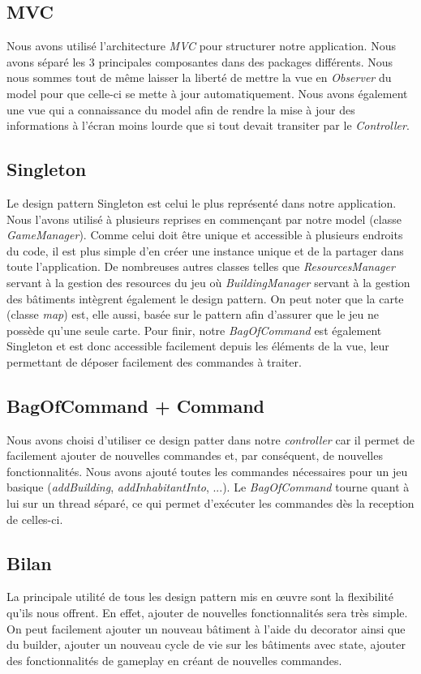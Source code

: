 \documentclass{article}
\begin{document}
\subsection{MVC}
Nous avons utilisé l'architecture \textit{MVC} pour structurer notre application. Nous avons séparé les 3 principales composantes
dans des packages différents. Nous nous sommes tout de même laisser la liberté de mettre la vue en \textit{Observer} du model pour
que celle-ci se mette à jour automatiquement. Nous avons également une vue qui a connaissance du model afin de rendre la mise à
jour des informations à l'écran moins lourde que si tout devait transiter par le \textit{Controller}.

\subsection{Singleton}
Le design pattern Singleton est celui le plus représenté dans notre application. Nous l'avons utilisé à plusieurs reprises en commençant par
notre model (classe \textit{GameManager}). Comme celui doit être unique et accessible à plusieurs endroits du code, il est plus simple d'en créer 
une instance unique et de la partager dans toute l'application. De nombreuses autres classes telles que \textit{ResourcesManager} servant à la gestion
des resources du jeu où \textit{BuildingManager} servant à la gestion des bâtiments intègrent également le design pattern. On peut noter que la carte 
(classe \textit{map}) est, elle aussi, basée sur le pattern afin d'assurer que le jeu ne possède qu'une seule carte. Pour finir, notre \textit{BagOfCommand}
est également Singleton et est donc accessible facilement depuis les éléments de la vue, leur permettant de déposer facilement des commandes à traiter.

\subsection{BagOfCommand + Command}
Nous avons choisi d'utiliser ce design patter dans notre \textit{controller} car il permet de facilement ajouter de nouvelles commandes et, par conséquent,
de nouvelles fonctionnalités. Nous avons ajouté toutes les commandes nécessaires pour un jeu basique (\textit{addBuilding}, \textit{addInhabitantInto}, ...).
Le \textit{BagOfCommand} tourne quant à lui sur un thread séparé, ce qui permet d'exécuter les commandes dès la reception de celles-ci.

\subsection{Bilan}
La principale utilité de tous les design pattern mis en œuvre sont la flexibilité qu'ils nous offrent. En effet, ajouter de nouvelles fonctionnalités sera
très simple. On peut facilement ajouter un nouveau bâtiment à l'aide du decorator ainsi que du builder, ajouter un nouveau cycle de vie sur les bâtiments 
avec state, ajouter des fonctionnalités de gameplay en créant de nouvelles commandes.
\end{document}
